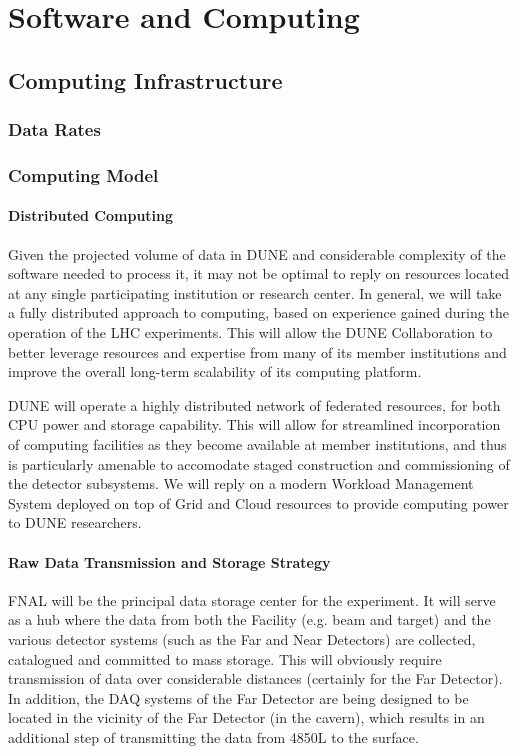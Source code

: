 \chapter{Software and Computing}
\label{ch:detectors-sc}

\section{Computing Infrastructure}
\label{sec:detectors-sc-infrastructure}

\subsection{Data Rates}
\label{sec:detectors-sc-infrastructure-data-rates}

\subsection{Computing Model}
\label{sec:detectors-sc-infrastructure-computing-model}

\subsubsection{Distributed Computing}

Given the projected volume of  data in DUNE and considerable complexity of the software needed to process it, it may not be optimal to reply on resources located at any single
participating institution or research center. In general, we will take a fully distributed approach to computing, based on experience gained during the operation of the LHC experiments.
This will allow the DUNE Collaboration to better leverage resources and expertise from many of its member institutions and improve the overall long-term scalability of its computing
platform.

DUNE will operate a highly distributed network of federated resources, for both CPU power and storage capability. This will allow for streamlined incorporation of computing facilities
as they become available at member institutions, and thus is particularly amenable to accomodate staged construction and commissioning of the detector subsystems. We will reply
on a modern Workload Management System deployed on top of Grid and Cloud resources to provide computing power to DUNE researchers.

\subsubsection{Raw Data Transmission and Storage Strategy}
FNAL will be the principal data storage center for the experiment. It will serve as a hub where the data from both the Facility (e.g. beam and target)
and the various detector systems (such as the  Far and Near Detectors)  are collected, catalogued and committed to mass storage. This will obviously require transmission of
data over considerable distances (certainly for the Far Detector). In addition, the DAQ systems of the Far Detector are being designed to be located  in the vicinity of
the Far Detector (in the cavern), which results in an additional step of transmitting the data from 4850L to the surface.

